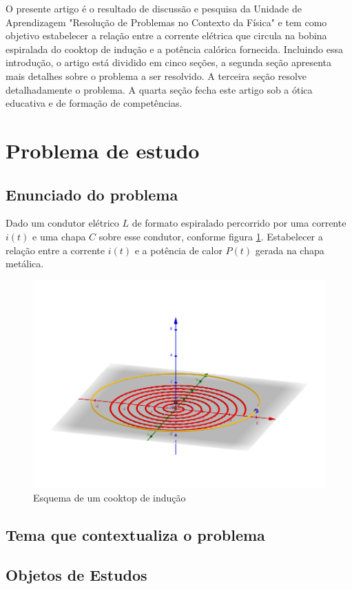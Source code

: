 \documentclass[
	article,			%
	11pt,				%
	oneside,			%
	a4paper,			%
	english,			%
	brazil,				%
	sumario=tradicional
	]{abntex2}
\begin{document}
O presente artigo é o resultado de discussão e pesquisa da Unidade de Aprendizagem "Resolução de Problemas no Contexto da Física" e tem como objetivo estabelecer a relação entre a corrente elétrica que circula na bobina espiralada do cooktop de indução e a potência calórica fornecida. Incluindo essa introdução, o artigo está dividido em cinco seções, a segunda seção apresenta mais detalhes sobre o problema a ser resolvido. A terceira seção resolve detalhadamente o problema. A quarta seção fecha este artigo sob a ótica educativa e de formação de competências.

\section{Problema de estudo}

\subsection{Enunciado do problema}

Dado um condutor elétrico $ L $ de formato espiralado percorrido por uma corrente $ i(t) $ e uma chapa $ C $ sobre esse condutor, conforme figura \ref{fig:fig1}. Estabelecer a relação entre a corrente $ i(t) $ e a potência de calor $ P(t) $ gerada na chapa metálica.

\begin{figure}[h]
	\centering
	\includegraphics[width=0.7\linewidth]{figures/fig1}
	\caption[Esquema de um cooktop de indução]{Esquema de um cooktop de indução}
	\label{fig:fig1}
\end{figure}

\subsection{Tema que contextualiza o problema}

\subsection{Objetos de Estudos}
\end{document}
